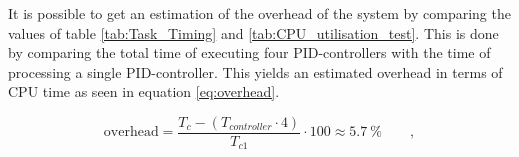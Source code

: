 \documentclass[../../main.tex]{subfiles}
\begin{document}
It is possible to get an estimation of the overhead of the system by comparing the values of table \ref{tab:Task_Timing} and \ref{tab:CPU_utilisation_test}. This is done by comparing the total time of executing four PID-controllers with the time of processing a single PID-controller. This yields an estimated overhead in terms of CPU time as seen in equation \ref{eq:overhead}.

\begin{equation}\label{eq:overhead}
    \mathrm{overhead}=\frac{T_{c}-(T_{controller}\cdot 4)}{T_{c1}}\cdot 100 \approx \SI{5,7}{\percent} \qquad ,
\end{equation}




\end{document}
